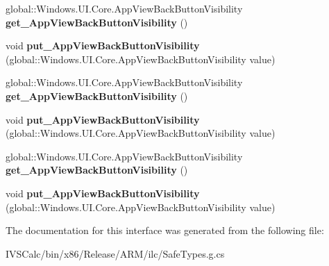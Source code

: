 \begin{DoxyCompactItemize}
global\+::\+Windows.\+U\+I.\+Core.\+App\+View\+Back\+Button\+Visibility {\bfseries get\+\_\+\+App\+View\+Back\+Button\+Visibility} ()
\item 
\mbox{\label{interface_windows_1_1_u_i_1_1_core_1_1_i_system_navigation_manager2_affcf0dd5301e8f89cfc099f18dbd0573}} 
void {\bfseries put\+\_\+\+App\+View\+Back\+Button\+Visibility} (global\+::\+Windows.\+U\+I.\+Core.\+App\+View\+Back\+Button\+Visibility value)
\item 
\mbox{\label{interface_windows_1_1_u_i_1_1_core_1_1_i_system_navigation_manager2_ade85ceb38ee3c82b70ebf9159dae8d03}} 
global\+::\+Windows.\+U\+I.\+Core.\+App\+View\+Back\+Button\+Visibility {\bfseries get\+\_\+\+App\+View\+Back\+Button\+Visibility} ()
\item 
\mbox{\label{interface_windows_1_1_u_i_1_1_core_1_1_i_system_navigation_manager2_affcf0dd5301e8f89cfc099f18dbd0573}} 
void {\bfseries put\+\_\+\+App\+View\+Back\+Button\+Visibility} (global\+::\+Windows.\+U\+I.\+Core.\+App\+View\+Back\+Button\+Visibility value)
\item 
\mbox{\label{interface_windows_1_1_u_i_1_1_core_1_1_i_system_navigation_manager2_ade85ceb38ee3c82b70ebf9159dae8d03}} 
global\+::\+Windows.\+U\+I.\+Core.\+App\+View\+Back\+Button\+Visibility {\bfseries get\+\_\+\+App\+View\+Back\+Button\+Visibility} ()
\item 
\mbox{\label{interface_windows_1_1_u_i_1_1_core_1_1_i_system_navigation_manager2_affcf0dd5301e8f89cfc099f18dbd0573}} 
void {\bfseries put\+\_\+\+App\+View\+Back\+Button\+Visibility} (global\+::\+Windows.\+U\+I.\+Core.\+App\+View\+Back\+Button\+Visibility value)
\end{DoxyCompactItemize}


The documentation for this interface was generated from the following file\+:\begin{DoxyCompactItemize}
\item 
I\+V\+S\+Calc/bin/x86/\+Release/\+A\+R\+M/ilc/Safe\+Types.\+g.\+cs\end{DoxyCompactItemize}
